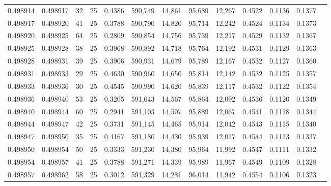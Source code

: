 \begin{tabular}{rrrrrrrrrrrrr}
0.498914 & 0.498917 &    32 &  25 &                                     0.4386 & 590,749 &  14,861 &  95,689 &  12,267 & 0.4522 & 0.1136 & 0.1377 \\
0.498917 & 0.498920 &    41 &  25 &                                     0.3788 & 590,790 &  14,820 &  95,714 &  12,242 & 0.4524 & 0.1134 & 0.1373 \\
0.498920 & 0.498925 &    64 &  25 &                                     0.2809 & 590,854 &  14,756 &  95,739 &  12,217 & 0.4529 & 0.1132 & 0.1367 \\
0.498925 & 0.498928 &    38 &  25 &                                     0.3968 & 590,892 &  14,718 &  95,764 &  12,192 & 0.4531 & 0.1129 & 0.1363 \\
0.498928 & 0.498931 &    39 &  25 &                                     0.3906 & 590,931 &  14,679 &  95,789 &  12,167 & 0.4532 & 0.1127 & 0.1360 \\
0.498931 & 0.498933 &    29 &  25 &                                     0.4630 & 590,960 &  14,650 &  95,814 &  12,142 & 0.4532 & 0.1125 & 0.1357 \\
0.498933 & 0.498936 &    30 &  25 &                                     0.4545 & 590,990 &  14,620 &  95,839 &  12,117 & 0.4532 & 0.1122 & 0.1354 \\
0.498936 & 0.498940 &    53 &  25 &                                     0.3205 & 591,043 &  14,567 &  95,864 &  12,092 & 0.4536 & 0.1120 & 0.1349 \\
0.498940 & 0.498944 &    60 &  25 &                                     0.2941 & 591,103 &  14,507 &  95,889 &  12,067 & 0.4541 & 0.1118 & 0.1344 \\
0.498944 & 0.498947 &    42 &  25 &                                     0.3731 & 591,145 &  14,465 &  95,914 &  12,042 & 0.4543 & 0.1115 & 0.1340 \\
0.498947 & 0.498950 &    35 &  25 &                                     0.4167 & 591,180 &  14,430 &  95,939 &  12,017 & 0.4544 & 0.1113 & 0.1337 \\
0.498950 & 0.498954 &    50 &  25 &                                     0.3333 & 591,230 &  14,380 &  95,964 &  11,992 & 0.4547 & 0.1111 & 0.1332 \\
0.498954 & 0.498957 &    41 &  25 &                                     0.3788 & 591,271 &  14,339 &  95,989 &  11,967 & 0.4549 & 0.1109 & 0.1328 \\
0.498957 & 0.498962 &    58 &  25 &                                     0.3012 & 591,329 &  14,281 &  96,014 &  11,942 & 0.4554 & 0.1106 & 0.1323 \\

\end{tabular}
